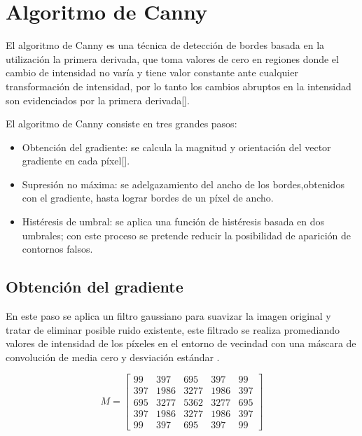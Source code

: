 \section{Algoritmo de Canny}

El algoritmo de Canny es una técnica de detección de bordes basada en la utilización la primera derivada, que toma valores de cero en regiones donde el cambio de intensidad no varía y tiene valor constante ante cualquier transformación de intensidad, por lo tanto los cambios abruptos en la intensidad son evidenciados por la primera derivada[].

El algoritmo de Canny consiste en tres grandes pasos: 

\begin{itemize}
\item Obtención del gradiente: se calcula la magnitud y orientación del vector gradiente en cada píxel[]. 
\item Supresión no máxima: se adelgazamiento del ancho de los bordes,obtenidos con el gradiente, hasta lograr bordes de un píxel de ancho. 
\item Histéresis de umbral: se aplica una función de histéresis basada en dos umbrales; con este proceso se pretende reducir la posibilidad de aparición de contornos falsos. 
\end{itemize}

\subsection{Obtención del gradiente}

En este paso se aplica un filtro gaussiano para suavizar la imagen original y tratar de eliminar posible ruido existente, este filtrado se realiza promediando valores de intensidad de los píxeles en el entorno de vecindad con una 
máscara de convolución de media cero y desviación estándar \sigma.

\begin{equation}
M =\begin{bmatrix}
99 & 397 & 695 & 397 & 99 \\ 
397 & 1986 & 3277 & 1986 & 397 \\ 
695 & 3277 & 5362 & 3277 & 695 \\ 
397 & 1986 & 3277 & 1986 & 397 \\ 
99 & 397 & 695 & 397 & 99
\end{bmatrix}
\end{equation}

